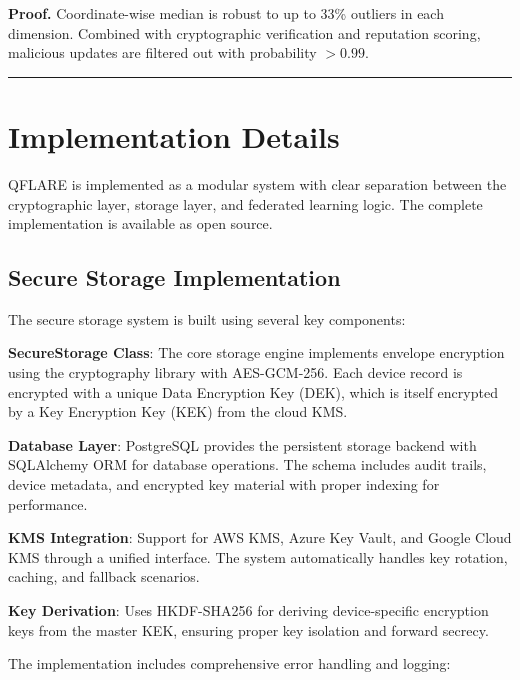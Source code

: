 \documentclass[onecolumn,11pt]{article}
\newenvironment{proof}[1][Proof]{\noindent\textbf{#1.} }{\ \rule{0.5em}{0.5em}}
\begin{document}
\begin{proof}
Coordinate-wise median is robust to up to 33\% outliers in each dimension. Combined with cryptographic verification and reputation scoring, malicious updates are filtered out with probability $> 0.99$.
\end{proof}

\section{Implementation Details}
\label{sec:implementation}

QFLARE is implemented as a modular system with clear separation between the cryptographic layer, storage layer, and federated learning logic. The complete implementation is available as open source.

\subsection{Secure Storage Implementation}

The secure storage system is built using several key components:

\textbf{SecureStorage Class}: The core storage engine implements envelope encryption using the cryptography library with AES-GCM-256. Each device record is encrypted with a unique Data Encryption Key (DEK), which is itself encrypted by a Key Encryption Key (KEK) from the cloud KMS.

\textbf{Database Layer}: PostgreSQL provides the persistent storage backend with SQLAlchemy ORM for database operations. The schema includes audit trails, device metadata, and encrypted key material with proper indexing for performance.

\textbf{KMS Integration}: Support for AWS KMS, Azure Key Vault, and Google Cloud KMS through a unified interface. The system automatically handles key rotation, caching, and fallback scenarios.

\textbf{Key Derivation}: Uses HKDF-SHA256 for deriving device-specific encryption keys from the master KEK, ensuring proper key isolation and forward secrecy.

The implementation includes comprehensive error handling and logging:
\end{document}
